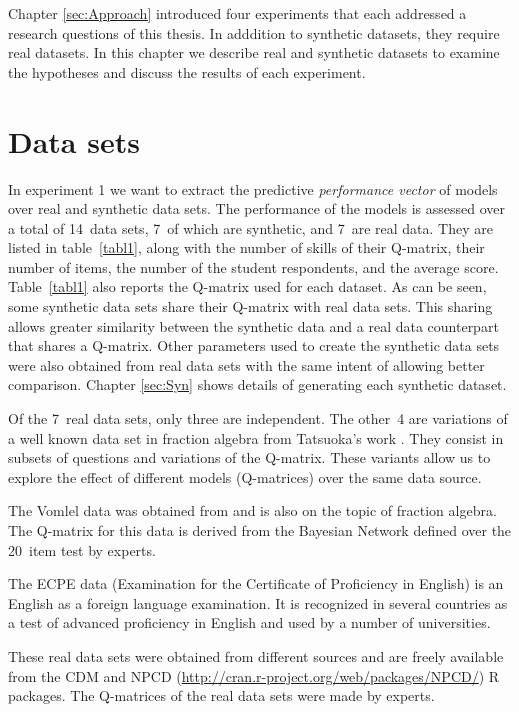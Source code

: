 \label{sec:SIGNATURE}

Chapter \ref{sec:Approach} introduced four experiments that each addressed a research questions of this thesis. In adddition to synthetic datasets, they require real datasets.  In this chapter we describe real and synthetic datasets to examine the hypotheses and discuss the results of each experiment.

\section{Data sets}

In experiment 1 we want to extract the predictive \textit{performance vector} of models over real and synthetic data sets. The performance of the models is assessed over a total of 14~data sets, 7~of which are synthetic, and 7~are real data.  They are listed in table~\ref{tabl1}, along with the number of skills of their Q-matrix, their number of items, the number of the student respondents, and the average score.  Table~\ref{tabl1} also reports the Q-matrix used for each dataset.  As can be seen, some synthetic data sets share their Q-matrix with real data sets.  This sharing allows greater similarity between the synthetic data and a real data counterpart that shares a Q-matrix.  Other parameters used to create the synthetic data sets were also obtained from real data sets with the same intent of allowing better comparison. Chapter \ref{sec:Syn} shows details of generating each synthetic dataset.

Of the 7~real data sets, only three are independent.  The other~4 are variations of a well known data set in fraction algebra from Tatsuoka's work \citep{tatsuoka1984analysis}.  They consist in subsets of questions and variations of the Q-matrix.  These variants allow us to explore the effect of different models (Q-matrices) over the same data source.

The Vomlel data was obtained from \citep{vomlel:2004} and is also on the topic of fraction algebra.  The Q-matrix for this data is derived from the Bayesian Network defined over the 20~item test by experts.

The ECPE data (Examination for the Certificate of Proficiency in English) is an English as a foreign language examination. It is recognized in several countries as a test of advanced proficiency in English and used by a number of universities.

These real data sets were obtained from different sources and are freely available from the CDM \citep{Robitzsch2012} and NPCD ({\url{http://cran.r-project.org/web/packages/NPCD/}}) R packages. The Q-matrices of the real data sets were made by experts.

